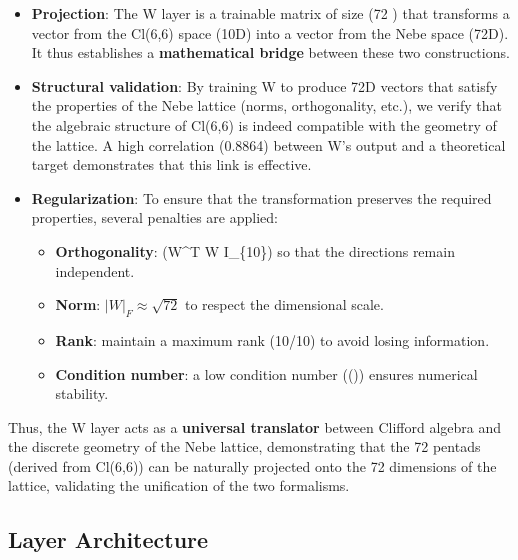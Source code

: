 \documentclass[11pt]{article}
\providecommand{\tightlist}{%
\setlength{\itemsep}{2pt}\setlength{\parskip}{6pt}
}
\begin{document}
\begin{itemize}
\tightlist
\item
  \textbf{Projection}: The W layer is a trainable matrix of size (72
  ) that transforms a vector from the Cl(6,6) space (10D) into
  a vector from the Nebe space (72D). It thus establishes a
  \textbf{mathematical bridge} between these two constructions.
\item
  \textbf{Structural validation}: By training W to produce 72D vectors
  that satisfy the properties of the Nebe lattice (norms, orthogonality,
  etc.), we verify that the algebraic structure of Cl(6,6) is indeed
  compatible with the geometry of the lattice. A high correlation
  (0.8864) between W's output and a theoretical target demonstrates that
  this link is effective.
\item
  \textbf{Regularization}: To ensure that the transformation preserves
  the required properties, several penalties are applied:

  \begin{itemize}
  \tightlist
  \item
    \textbf{Orthogonality}: (W\^{}T W \approx I\_\{10\}) so that the
    directions remain independent.
  \item
    \textbf{Norm}: \(|W|_F \approx \sqrt{72}\) to respect the
    dimensional scale.
  \item
    \textbf{Rank}: maintain a maximum rank (10/10) to avoid losing
    information.
  \item
    \textbf{Condition number}: a low condition number (())
    ensures numerical stability.
  \end{itemize}
\end{itemize}

Thus, the W layer acts as a \textbf{universal translator} between
Clifford algebra and the discrete geometry of the Nebe lattice,
demonstrating that the 72 pentads (derived from Cl(6,6)) can be
naturally projected onto the 72 dimensions of the lattice, validating
the unification of the two formalisms.

\hypertarget{layer-architecture}{%
\subsection{Layer Architecture}\label{layer-architecture}}

\begin{center}
\end{center}
\end{document}
